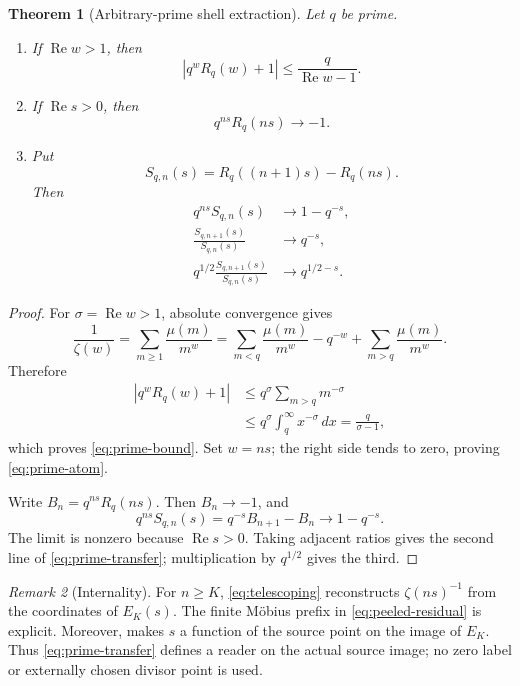 \documentclass[11pt]{article}
\newtheorem{theorem}{Theorem}[section]
\theoremstyle{definition}
\theoremstyle{remark}
\newtheorem{remark}[theorem]{Remark}
\newcommand{\Rea}{\operatorname{Re}}
\begin{document}
\begin{theorem}[Arbitrary-prime shell extraction]\label{thm:prime-extraction}
Let \(q\) be prime.
\begin{enumerate}[label=\textup{(\roman*)},leftmargin=2.2em]
\item If \(\Rea w>1\), then
\[
               \left|q^wR_q(w)+1\right|
                    \leq\frac{q}{\Rea w-1}.
\tag{4.2}\label{eq:prime-bound}
\]
\item If \(\Rea s>0\), then
\[
                   q^{ns}R_q(ns)\longrightarrow-1.
\tag{4.3}\label{eq:prime-atom}
\]
\item Put
\[
             S_{q,n}(s)=R_q((n+1)s)-R_q(ns).
\tag{4.4}\label{eq:peeled-shell}
\]
Then
\[
\begin{aligned}
 q^{ns}S_{q,n}(s)&\longrightarrow1-q^{-s},\\
 \frac{S_{q,n+1}(s)}{S_{q,n}(s)}&\longrightarrow q^{-s},\\
 q^{1/2}\frac{S_{q,n+1}(s)}{S_{q,n}(s)}
     &\longrightarrow q^{1/2-s}.
\end{aligned}
\tag{4.5}\label{eq:prime-transfer}
\]
\end{enumerate}
\end{theorem}

\begin{proof}
For \(\sigma=\Rea w>1\), absolute convergence gives
\[
 \frac1{\zeta(w)}
   =\sum_{m\geq1}\frac{\mu(m)}{m^w}
   =\sum_{m<q}\frac{\mu(m)}{m^w}-q^{-w}
      +\sum_{m>q}\frac{\mu(m)}{m^w}.
\]
Therefore
\[
\begin{aligned}
 |q^wR_q(w)+1|
 &\leq q^\sigma\sum_{m>q}m^{-\sigma}\\
 &\leq q^\sigma\int_q^\infty x^{-\sigma}\,dx
  =\frac{q}{\sigma-1},
\end{aligned}
\]
which proves \eqref{eq:prime-bound}.  Set \(w=ns\); the right side tends
to zero, proving \eqref{eq:prime-atom}.

Write \(B_n=q^{ns}R_q(ns)\).  Then \(B_n\to-1\), and
\[
 q^{ns}S_{q,n}(s)=q^{-s}B_{n+1}-B_n
       \longrightarrow1-q^{-s}.
\]
The limit is nonzero because \(\Rea s>0\).  Taking adjacent ratios gives
the second line of \eqref{eq:prime-transfer}; multiplication by
\(q^{1/2}\) gives the third.
\end{proof}

\begin{remark}[Internality]
For \(n\geq K\), \eqref{eq:telescoping} reconstructs
\(\zeta(ns)^{-1}\) from the coordinates of \(E_K(s)\).  The finite M\"obius
prefix in \eqref{eq:peeled-residual} is explicit.  Moreover,
 makes \(s\) a function of the source point on the image
of \(E_K\).  Thus \eqref{eq:prime-transfer} defines a reader on the actual
source image; no zero label or externally chosen divisor point is used.
\end{remark}
\end{document}
